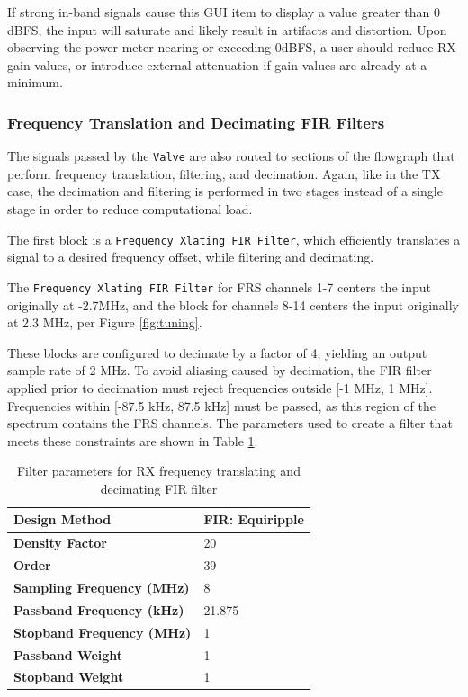 If strong in-band signals cause this \ac{GUI} item to display a value
greater than 0 dBFS, the input will saturate and likely result in artifacts
and distortion. Upon observing the power meter nearing or exceeding 0dBFS, a
user should reduce \ac{RX} gain values, or introduce external attenuation if
gain values are already at a minimum.

\subsubsection{Frequency Translation and Decimating FIR Filters}
The signals passed by the \texttt{Valve} are also routed to sections of
the flowgraph that perform frequency translation, filtering, and decimation.
Again, like in the \ac{TX} case, the decimation and filtering is performed
in two stages instead of a single stage in order to reduce computational load.

The first block is a \texttt{Frequency Xlating FIR Filter}, which efficiently
translates a signal to a desired frequency offset, while filtering and
decimating.

The \texttt{Frequency Xlating FIR Filter} for \ac{FRS} channels 1-7 centers
the input originally at -2.7MHz, and the block for channels 8-14 centers the
input originally at 2.3 MHz, per Figure \ref{fig:tuning}.

These blocks are configured to decimate by a factor of 4, yielding an output
sample rate of 2 MHz. To avoid aliasing caused by decimation, the \ac{FIR}
filter applied prior to decimation must reject frequencies outside [-1 MHz, 1
MHz]. Frequencies within [-87.5 kHz, 87.5 kHz] must be passed, as this region
of the spectrum contains the \ac{FRS} channels. The parameters used to create a
filter that meets these constraints are shown in Table \ref{tab:rx_xlat_fir}.

\begin{table}[h]
  \centering
  \caption{Filter parameters for RX frequency translating and decimating FIR filter}
  \label{tab:rx_xlat_fir}
  \footnotesize
  \begin{tabular} {|l|l|}
    \hline
    \textbf{Design Method}              & FIR: Equiripple \\ \hline
    \textbf{Density Factor}             & 20              \\ \hline
    \textbf{Order}                      & 39              \\ \hline
    \textbf{Sampling Frequency (MHz)}   & 8               \\ \hline
    \textbf{Passband Frequency (kHz)}   & 21.875          \\ \hline
    \textbf{Stopband Frequency (MHz)}   & 1               \\ \hline
    \textbf{Passband Weight}            & 1               \\ \hline
    \textbf{Stopband Weight}            & 1               \\ \hline
  \end{tabular}
\end{table}

